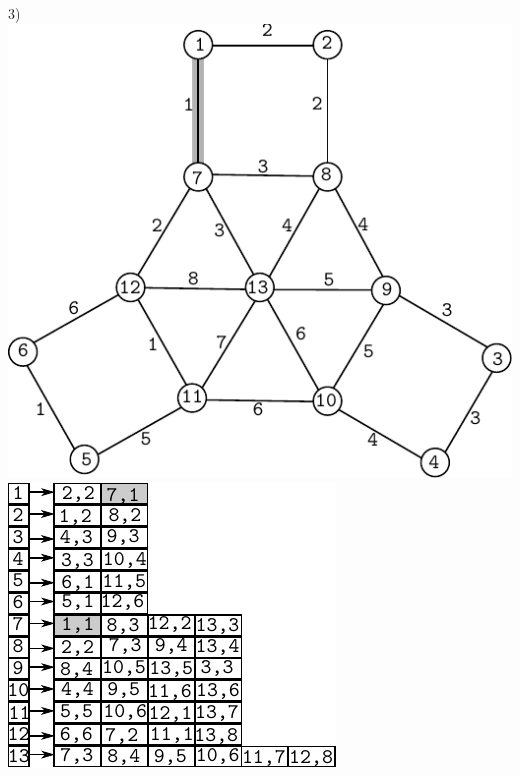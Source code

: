 \documentclass{article}
\begin{document}
\begin{center}
3)\includegraphics[scale=0.6]{bottleneck/g3}
\hspace{5mm}
\includegraphics[scale=0.9]{bottleneck/l3}
\end{center}
\end{document}
